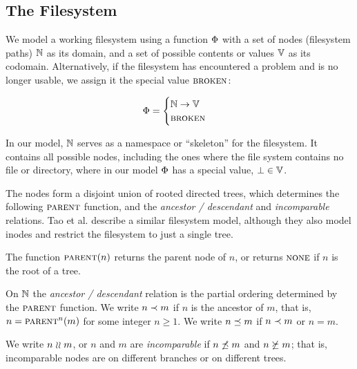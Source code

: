 
\subsection{The Filesystem}

We model a working filesystem
using a function $\Phi$ with a set of nodes (filesystem paths) $\mathbb{N}$ as its domain,
and a set of possible contents or values $\mathbb{V}$ as its codomain.
Alternatively, if the filesystem has encountered a problem and is no longer usable, 
we assign it the special value $\text{\normalfont\scshape{broken}}$:
\begin{mydef}[Filesystem]
\begin{gather*}
\Phi =
\begin{cases}
\mathbb{N} \rightarrow \mathbb{V} \\
\text{\normalfont\scshape{broken}}
\end{cases}
\end{gather*}
\end{mydef}
In our model, $\mathbb{N}$ 
serves as a namespace or ``skeleton'' for the filesystem.
It contains all possible nodes, including the ones 
where the file system contains no file or directory,
where in our model $\Phi$ has a special value, $\bot\in\mathbb{V}$.

The nodes form a disjoint union of rooted directed trees,
which determines the following $\parent$ function,
and the \emph{ancestor / descendant} and \emph{incomparable} relations.
Tao et al. \cite{TSR} describe a similar filesystem model, although
they also model inodes and restrict the filesystem to just a single tree.
\begin{mydef}[$\parent$]
The function $\text{\normalfont\scshape{parent}}(n)$ returns the parent node of $n$, or
returns $\text{\normalfont\scshape{none}}$ if $n$ is the root of a tree.
\end{mydef}

\begin{mydef}[$n\descendant m$]
On $\mathbb{N}$ the \emph{ancestor / descendant} relation is the
partial ordering determined by the $\parent$ function.
We write $n\descendant m$ if $n$ is the ancestor of $m$,
that is, $n=\text{\normalfont\scshape{parent}}^n(m)$ for some integer $n\ge 1$.
We write $n\preceq m$ if $n\descendant m$ or $n=m$.
\end{mydef}

\begin{mydef}[$n\unrel m$]
We write $n\unrel m$, or $n$ and $m$ are \emph{incomparable}
if $n\not\preceq m$ and $n\not\succeq m$;
that is, incomparable nodes are on different branches or on different trees.
\end{mydef}

